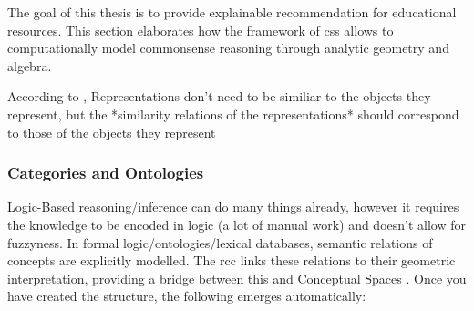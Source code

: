 
The goal of this thesis is to provide explainable recommendation for educational resources. This section elaborates how the framework of \glspl{cs} allows to computationally model commonsense reasoning through analytic geometry and algebra.


According to \cite{Gardenfors2000a}, Representations don't need to be similiar to the objects they represent, but the *similarity relations of the representations* should correspond to those of the objects they represent

\subsubsection*{Categories and Ontologies}



Logic-Based reasoning/inference can do many things already, however it requires the knowledge to be encoded in logic (a lot of manual work) and doesn't allow for fuzzyness.
In formal logic/ontologies/lexical databases, semantic relations of concepts are explicitly modelled. The \gls{rcc} \cite{Cohn1997a} links these relations to their geometric interpretation, providing a bridge between this and Conceptual Spaces \cite{Gardenfors2001}. Once you have created the structure, the following emerges automatically:

\vspace{2ex}

